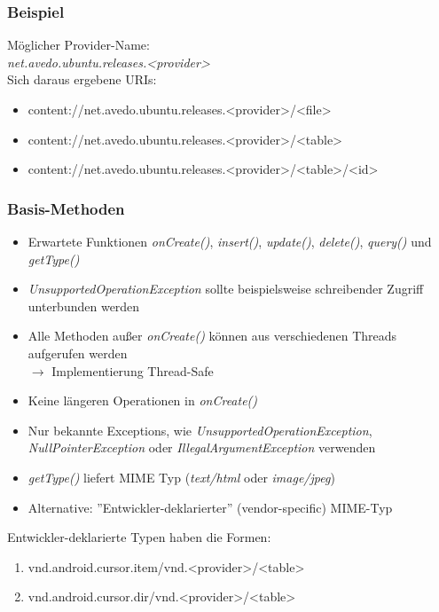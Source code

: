 \begin{frame}
   \frametitle{Beispiel}
   
   Möglicher Provider-Name:\\
   \emph{net.avedo.ubuntu.releases.\textless{}provider\textgreater}\\
   
   Sich daraus ergebene URIs:
   \begin{itemize}
		\item content://net.avedo.ubuntu.releases.\textless{}provider\textgreater/\textless{}file\textgreater
		\item content://net.avedo.ubuntu.releases.\textless{}provider\textgreater/\textless{}table\textgreater
		\item content://net.avedo.ubuntu.releases.\textless{}provider\textgreater/\textless{}table\textgreater/\textless{}id\textgreater
	\end{itemize}
\end{frame}

\begin{frame}
   \frametitle{Basis-Methoden}
   \begin{itemize}
   	\item Erwartete Funktionen \emph{onCreate()}, \emph{insert()}, \emph{update()}, 
   		\emph{delete()}, \emph{query()} und \emph{getType()}
   	\item \emph{UnsupportedOperationException} sollte beispielsweise
   		schreibender Zugriff unterbunden werden
   	\item Alle Methoden außer \emph{onCreate()} können aus verschiedenen Threads 
   		aufgerufen werden\\
   		$\rightarrow$ Implementierung Thread-Safe
   	\item Keine längeren Operationen in \emph{onCreate()}
   	\item Nur bekannte Exceptions, wie \emph{UnsupportedOperationException}, 
   	\emph{NullPointerException} oder \emph{IllegalArgumentException} verwenden
   	\item \emph{getType()} liefert MIME Typ (\emph{text/html} oder \emph{image/jpeg})
   	\item Alternative: ''Entwickler-deklarierter'' (vendor-specific) MIME-Typ
	\end{itemize}
	
	Entwickler-deklarierte Typen haben die Formen:
	
   \begin{enumerate}
   	\item vnd.android.cursor.item/vnd.\textless{}provider\textgreater/\textless{}table\textgreater
   	\item vnd.android.cursor.dir/vnd.\textless{}provider\textgreater/\textless{}table\textgreater
   \end{enumerate}
\end{frame}


